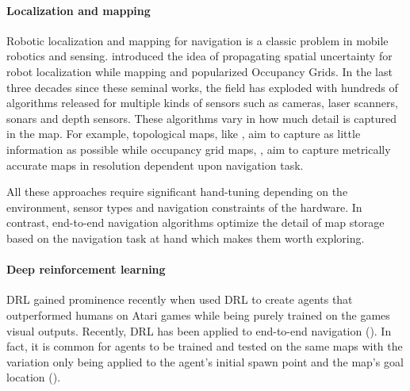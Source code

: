 \paragraph{Localization and mapping}
Robotic localization and mapping for navigation is a classic problem in  mobile robotics and sensing.
\cite{SmChIJRR1986} introduced the idea of propagating spatial uncertainty for robot localization while mapping and \cite{ElCOMPUTER1980} popularized Occupancy Grids.
In the last three decades since these seminal works, the field has exploded with hundreds of algorithms released for multiple kinds of sensors such as cameras, laser scanners, sonars and depth sensors.
These algorithms vary in how much detail is captured in the map. For example, topological maps, like \cite{KuCOGSCI1978}, aim to capture as little information as possible while occupancy grid maps, \cite{ElCOMPUTER1980}, aim to capture metrically accurate maps in resolution dependent upon navigation task.

All these approaches require significant hand-tuning depending on the environment, sensor types and navigation constraints of the hardware.
In contrast, end-to-end navigation algorithms optimize the detail of map storage based on the navigation task at hand which makes them worth exploring.

\paragraph{Deep reinforcement learning}
DRL gained prominence recently when \cite{MnKaSiNIPSDLW2013,MnKaSiNATURE2015} used DRL to create agents that outperformed humans on Atari games while being purely trained on the games visual outputs.
Recently, DRL has been applied to end-to-end navigation (\cite{OhChSiICML2016,MiPaViICLR2017,ChLaSaNIPS2016}).
In fact, it is common for agents to be trained and tested on the same maps with the variation only being applied to the agent's initial spawn point and the map's goal location (\cite{MiPaViICLR2017,ZhMoKoICRA2017,KuSaGaAPA2016}). 

